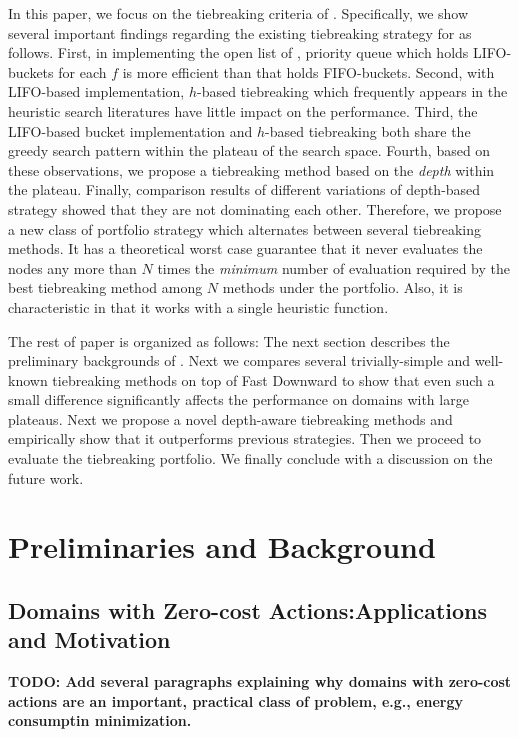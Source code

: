 In this paper, we focus on the tiebreaking criteria of \astar.
% 
Specifically, we show several important findings regarding the
existing tiebreaking strategy for \astar as follows.
% 
First, in implementing the open list of \astar, priority queue which holds
LIFO-buckets for each $f$ is more efficient than that holds FIFO-buckets.
% 
Second, with LIFO-based implementation, $h$-based tiebreaking which
frequently appears in the heuristic search literatures have little
impact on the performance.
% 
Third, the LIFO-based bucket implementation and $h$-based tiebreaking
both share the greedy search pattern within the plateau of the
search space.
% 
Fourth, based on these observations, we propose a tiebreaking
method based on the \emph{depth} within the plateau.
%
Finally, comparison results of different variations of depth-based
strategy showed that they are not dominating each other. Therefore, we
propose a new class of portfolio strategy which alternates between
several tiebreaking methods.
It has a theoretical worst case guarantee that it
never evaluates the nodes any more than $N$ times the \emph{minimum} number
of evaluation required by the best tiebreaking method among $N$ methods
under the portfolio.
Also, it is characteristic in that it works with a single heuristic function.
% 

The rest of paper is organized as follows: The next section describes the
preliminary backgrounds of \astar.
Next we compares several trivially-simple and well-known tiebreaking
methods on top of Fast Downward to show that even such a small
difference significantly affects the performance on domains with
large plateaus.
Next we propose a novel depth-aware tiebreaking methods and empirically
show that it outperforms previous strategies.
Then we proceed to evaluate the tiebreaking portfolio.
We finally conclude with a discussion on the future work.

\section{Preliminaries and Background}

\subsection{Domains with Zero-cost Actions:Applications and Motivation}
{\bf TODO: Add several paragraphs explaining why domains with zero-cost actions are an important, practical class of problem, e.g., energy consumptin minimization.  }


